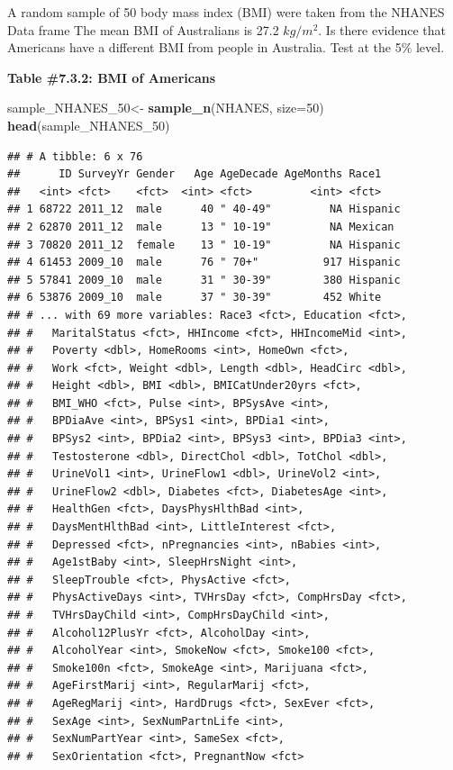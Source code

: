 \documentclass[
]{book}
\newenvironment{Shaded}{\begin{snugshade}}{\end{snugshade}}
\newcommand{\DataTypeTok}[1]{\textcolor[rgb]{0.13,0.29,0.53}{#1}}
\newcommand{\DecValTok}[1]{\textcolor[rgb]{0.00,0.00,0.81}{#1}}
\newcommand{\KeywordTok}[1]{\textcolor[rgb]{0.13,0.29,0.53}{\textbf{#1}}}
\newcommand{\NormalTok}[1]{#1}
\newcommand{\StringTok}[1]{\textcolor[rgb]{0.31,0.60,0.02}{#1}}
\begin{document}
A random sample of 50 body mass index (BMI) were taken from the NHANES Data frame The mean BMI of Australians is 27.2 \(kg/m^2\). Is there evidence that Americans have a different BMI from people in Australia. Test at the 5\% level.

\textbf{Table \#7.3.2: BMI of Americans}

\begin{Shaded}
\begin{Highlighting}[]
\NormalTok{sample_NHANES_}\DecValTok{50}\NormalTok{<-}
\StringTok{  }\KeywordTok{sample_n}\NormalTok{(NHANES, }\DataTypeTok{size=}\DecValTok{50}\NormalTok{)}
\KeywordTok{head}\NormalTok{(sample_NHANES_}\DecValTok{50}\NormalTok{)}
\end{Highlighting}
\end{Shaded}

\begin{verbatim}
## # A tibble: 6 x 76
##      ID SurveyYr Gender   Age AgeDecade AgeMonths Race1   
##   <int> <fct>    <fct>  <int> <fct>         <int> <fct>   
## 1 68722 2011_12  male      40 " 40-49"         NA Hispanic
## 2 62870 2011_12  male      13 " 10-19"         NA Mexican 
## 3 70820 2011_12  female    13 " 10-19"         NA Hispanic
## 4 61453 2009_10  male      76 " 70+"          917 Hispanic
## 5 57841 2009_10  male      31 " 30-39"        380 Hispanic
## 6 53876 2009_10  male      37 " 30-39"        452 White   
## # ... with 69 more variables: Race3 <fct>, Education <fct>,
## #   MaritalStatus <fct>, HHIncome <fct>, HHIncomeMid <int>,
## #   Poverty <dbl>, HomeRooms <int>, HomeOwn <fct>,
## #   Work <fct>, Weight <dbl>, Length <dbl>, HeadCirc <dbl>,
## #   Height <dbl>, BMI <dbl>, BMICatUnder20yrs <fct>,
## #   BMI_WHO <fct>, Pulse <int>, BPSysAve <int>,
## #   BPDiaAve <int>, BPSys1 <int>, BPDia1 <int>,
## #   BPSys2 <int>, BPDia2 <int>, BPSys3 <int>, BPDia3 <int>,
## #   Testosterone <dbl>, DirectChol <dbl>, TotChol <dbl>,
## #   UrineVol1 <int>, UrineFlow1 <dbl>, UrineVol2 <int>,
## #   UrineFlow2 <dbl>, Diabetes <fct>, DiabetesAge <int>,
## #   HealthGen <fct>, DaysPhysHlthBad <int>,
## #   DaysMentHlthBad <int>, LittleInterest <fct>,
## #   Depressed <fct>, nPregnancies <int>, nBabies <int>,
## #   Age1stBaby <int>, SleepHrsNight <int>,
## #   SleepTrouble <fct>, PhysActive <fct>,
## #   PhysActiveDays <int>, TVHrsDay <fct>, CompHrsDay <fct>,
## #   TVHrsDayChild <int>, CompHrsDayChild <int>,
## #   Alcohol12PlusYr <fct>, AlcoholDay <int>,
## #   AlcoholYear <int>, SmokeNow <fct>, Smoke100 <fct>,
## #   Smoke100n <fct>, SmokeAge <int>, Marijuana <fct>,
## #   AgeFirstMarij <int>, RegularMarij <fct>,
## #   AgeRegMarij <int>, HardDrugs <fct>, SexEver <fct>,
## #   SexAge <int>, SexNumPartnLife <int>,
## #   SexNumPartYear <int>, SameSex <fct>,
## #   SexOrientation <fct>, PregnantNow <fct>
\end{verbatim}
\end{document}
